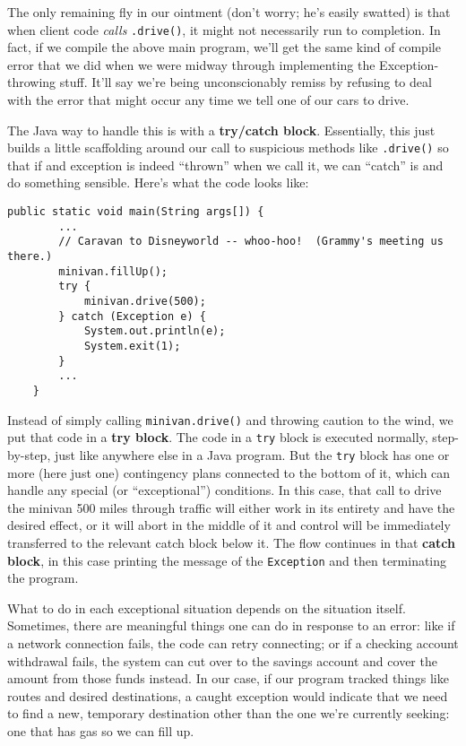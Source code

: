 The only remaining fly in our ointment (don't worry; he's easily swatted) is
that when client code \textit{calls} \texttt{.drive()}, it might not
necessarily run to completion. In fact, if we compile the above main program,
we'll get the same kind of compile error that we did when we were midway
through implementing the Exception-throwing stuff. It'll say we're being
unconscionably remiss by refusing to deal with the error that might occur
any time we tell one of our cars to drive.

The Java way to handle this is with a \textbf{try/catch block}. Essentially,
this just builds a little scaffolding around our call to suspicious methods
like \texttt{.drive()} so that if and exception is indeed ``thrown'' when we
call it, we can ``catch'' is and do something sensible. Here's what the code
looks like:

\begin{Verbatim}[samepage=true,fontsize=\footnotesize,frame=single]
    public static void main(String args[]) {
        ...
        // Caravan to Disneyworld -- whoo-hoo!  (Grammy's meeting us there.)
        minivan.fillUp();
        try {
            minivan.drive(500);
        } catch (Exception e) {
            System.out.println(e);
            System.exit(1);
        }
        ...
    }
\end{Verbatim}

Instead of simply calling \texttt{minivan.drive()} and throwing caution to the
wind, we put that code in a \textbf{try block}. The code in a \texttt{try}
block is executed normally, step-by-step, just like anywhere else in a Java
program. But the \texttt{try} block has one or more (here just one)
contingency plans connected to the bottom of it, which can handle any special
(or ``exceptional'') conditions. In this case, that call to drive the minivan
500 miles through traffic will either work in its entirety and have the
desired effect, or it will abort in the middle of it and control will be
immediately transferred to the relevant catch block below it. The flow
continues in that \textbf{catch block}, in this case printing the message of
the \texttt{Exception} and then terminating the program.

What to do in each exceptional situation depends on the situation itself.
Sometimes, there are meaningful things one can do in response to an error:
like if a network connection fails, the code can retry connecting; or if a
checking account withdrawal fails, the system can cut over to the savings
account and cover the amount from those funds instead. In our case, if our
program tracked things like routes and desired destinations, a caught
exception would indicate that we need to find a new, temporary destination
other than the one we're currently seeking: one that has gas so we can fill
up.

